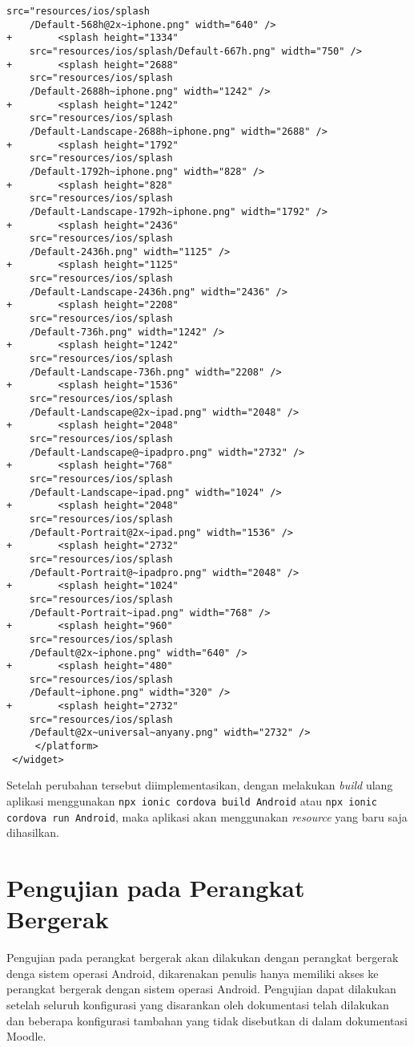 \begin{lstlisting}[frame=single, label ={app-resource}, caption = Menggunakan \textit{resource} yang baru saja dihasilkan di dalam aplikasi ]
	src="resources/ios/splash
	/Default-568h@2x~iphone.png" width="640" />
+        <splash height="1334" 
	src="resources/ios/splash/Default-667h.png" width="750" />
+        <splash height="2688" 
	src="resources/ios/splash
	/Default-2688h~iphone.png" width="1242" />
+        <splash height="1242" 
	src="resources/ios/splash
	/Default-Landscape-2688h~iphone.png" width="2688" />
+        <splash height="1792" 
	src="resources/ios/splash
	/Default-1792h~iphone.png" width="828" />
+        <splash height="828"
	src="resources/ios/splash
	/Default-Landscape-1792h~iphone.png" width="1792" />
+        <splash height="2436" 
	src="resources/ios/splash
	/Default-2436h.png" width="1125" />
+        <splash height="1125" 
	src="resources/ios/splash
	/Default-Landscape-2436h.png" width="2436" />
+        <splash height="2208" 
	src="resources/ios/splash
	/Default-736h.png" width="1242" />
+        <splash height="1242" 
	src="resources/ios/splash
	/Default-Landscape-736h.png" width="2208" />
+        <splash height="1536" 
	src="resources/ios/splash
	/Default-Landscape@2x~ipad.png" width="2048" />
+        <splash height="2048" 
	src="resources/ios/splash
	/Default-Landscape@~ipadpro.png" width="2732" />
+        <splash height="768" 
	src="resources/ios/splash
	/Default-Landscape~ipad.png" width="1024" />
+        <splash height="2048"
	src="resources/ios/splash
	/Default-Portrait@2x~ipad.png" width="1536" />
+        <splash height="2732" 
	src="resources/ios/splash
	/Default-Portrait@~ipadpro.png" width="2048" />
+        <splash height="1024" 
	src="resources/ios/splash
	/Default-Portrait~ipad.png" width="768" />
+        <splash height="960" 
	src="resources/ios/splash
	/Default@2x~iphone.png" width="640" />
+        <splash height="480" 
	src="resources/ios/splash
	/Default~iphone.png" width="320" />
+        <splash height="2732"
	src="resources/ios/splash
	/Default@2x~universal~anyany.png" width="2732" />
     </platform>
 </widget>
\end{lstlisting}

Setelah perubahan tersebut diimplementasikan, dengan melakukan \textit{build} ulang aplikasi menggunakan \texttt{npx ionic cordova build Android} atau \texttt{npx ionic cordova run Android}, maka aplikasi akan menggunakan \textit{resource} yang baru saja dihasilkan.

\section{Pengujian pada Perangkat Bergerak}
Pengujian pada perangkat bergerak akan dilakukan dengan perangkat bergerak denga sistem operasi Android, dikarenakan penulis hanya memiliki akses ke perangkat bergerak dengan sistem operasi Android. Pengujian dapat dilakukan setelah seluruh konfigurasi yang disarankan oleh dokumentasi telah dilakukan dan beberapa konfigurasi tambahan yang tidak disebutkan di dalam dokumentasi Moodle.

